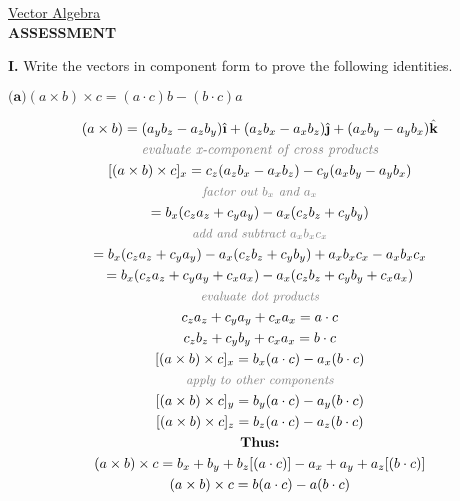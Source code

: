 \documentclass{article}
\newcommand{\ihat}{\hat{\textbf{\i}}}
\newcommand{\jhat}{\hat{\textbf{\j}}}
\newcommand{\khat}{\hat{\textbf{k}}}
\begin{document}
\begin{center}
    \underline{Vector Algebra} \\
    \vspace{0.2 cm}
    \large \textbf{ASSESSMENT}
\end{center}

\vspace{0.5 cm}

\large \noindent \textbf{I.} Write the vectors in component form to prove the following identities.

\vspace{0.5 cm}

{$\textbf{(a)}   (a \times b) \times c = (a \cdot c)b - (b \cdot c)a$} 

\begin{gather*}
    (a \times b) = (a_y b_z - a_z b_y)\ihat + (a_z b_x - a_x b_z)\jhat + (a_x b_y - a_y b_x)\khat \\
    \textit{\color{gray}evaluate x-component of cross products} \\
    [(a \times b) \times c]_x = c_z (a_z b_x - a_x b_z) - c_y(a_x b_y - a_y b_x) \\
    \small \textit{\color{gray}factor  out  $b_x$ and $a_x$} \\
    = b_x (c_z a_z + c_y a_y) - a_x(c_z b_z + c_y b_y) \\
    \small \textit{\color{gray}add and subtract  $a_x b_x c_x$} \\
    = b_x (c_z a_z + c_y a_y) - a_x(c_z b_z + c_y b_y) + a_x b_x c_x - a_x b_x c_x \\
    = b_x (c_z a_z + c_y a_y + c_x a_x) - a_x(c_z b_z + c_y b_y + c_x a_x) \\
    \small \textit{\color{gray}evaluate dot products} \\
    c_z a_z + c_y a_y + c_x a_x = a \cdot c \\ 
    c_z b_z + c_y b_y + c_x a_x = b \cdot c \\
    [(a \times b) \times c]_x = b_x ( a \cdot c) - a_x (b \cdot c)\\
    \small \textit{\color{gray}apply to other components} \\
    [(a \times b) \times c]_y = b_y ( a \cdot c) - a_y (b \cdot c) \\
    [(a \times b) \times c]_z = b_z ( a \cdot c) - a_z (b \cdot c) \\
    \textbf{Thus:} \\
    (a \times b) \times c = b_x + b_y + b_z [( a \cdot c)] - a_x + a_y + a_z[(b \cdot c)] \\
    (a \times b) \times c = b( a \cdot c) - a(b \cdot c)
\end{gather*}
\end{document}
